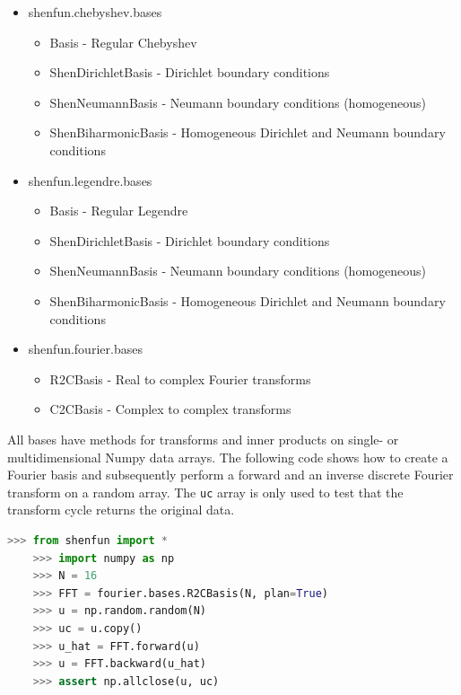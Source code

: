 \documentclass[%
oneside,                 %
final,                   %
10pt]{article}
\begin{document}
\begin{itemize}
  \item shenfun.chebyshev.bases
\begin{itemize}

    \item Basis - Regular Chebyshev 

    \item ShenDirichletBasis - Dirichlet boundary conditions

    \item ShenNeumannBasis - Neumann boundary conditions (homogeneous)

    \item ShenBiharmonicBasis - Homogeneous Dirichlet and Neumann boundary conditions

\end{itemize}

\noindent
  \item shenfun.legendre.bases
\begin{itemize}

    \item Basis - Regular Legendre

    \item ShenDirichletBasis - Dirichlet boundary conditions

    \item ShenNeumannBasis - Neumann boundary conditions (homogeneous)

    \item ShenBiharmonicBasis - Homogeneous Dirichlet and Neumann boundary conditions

\end{itemize}

\noindent
  \item shenfun.fourier.bases
\begin{itemize}

    \item R2CBasis - Real to complex Fourier transforms

    \item C2CBasis - Complex to complex transforms
\end{itemize}

\noindent
\end{itemize}

\noindent
All bases have methods for transforms and inner products on single- or multidimensional Numpy data arrays. The following code shows how to create a Fourier basis and subsequently perform a forward and an inverse discrete Fourier transform on a random array. The \texttt{uc} array is only used to test that the transform cycle returns the original data.
\begin{lstlisting}[language=Python,style=yellow2_fb]
    >>> from shenfun import *
    >>> import numpy as np
    >>> N = 16
    >>> FFT = fourier.bases.R2CBasis(N, plan=True) 
    >>> u = np.random.random(N)
    >>> uc = u.copy()
    >>> u_hat = FFT.forward(u)
    >>> u = FFT.backward(u_hat) 
    >>> assert np.allclose(u, uc)
\end{lstlisting}
\end{document}
